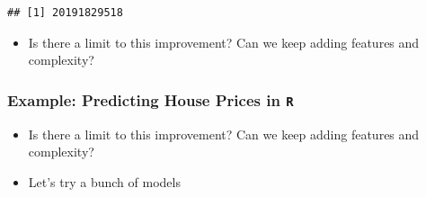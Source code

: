 \documentclass[
  shownotes,
  xcolor={svgnames},
  hyperref={colorlinks,citecolor=DarkBlue,linkcolor=DarkRed,urlcolor=DarkBlue}
  , aspectratio=169]{beamer}
\newenvironment{Shaded}{\begin{snugshade}}{\end{snugshade}}
\newcommand{\DataTypeTok}[1]{\textcolor[rgb]{0.13,0.29,0.53}{#1}}
\newcommand{\DecValTok}[1]{\textcolor[rgb]{0.00,0.00,0.81}{#1}}
\newcommand{\KeywordTok}[1]{\textcolor[rgb]{0.13,0.29,0.53}{\textbf{#1}}}
\newcommand{\NormalTok}[1]{#1}
\newcommand{\OperatorTok}[1]{\textcolor[rgb]{0.81,0.36,0.00}{\textbf{#1}}}
\newcommand{\StringTok}[1]{\textcolor[rgb]{0.31,0.60,0.02}{#1}}
\begin{document}
\begin{frame}[fragile]
\begin{tiny}
\begin{verbatim}
## [1] 20191829518
\end{verbatim}
\end{tiny}

\begin{itemize}
  \item Is there a limit to this improvement? Can we keep adding features and complexity?
\end{itemize}

\end{frame}

\begin{frame}[fragile]
\frametitle{Example: Predicting House Prices in \texttt{R}}

\begin{itemize}
  \item Is there a limit to this improvement? Can we keep adding features and complexity?
  \item Let's try a bunch of models
\end{itemize}

\begin{Shaded}
\scriptsize
{}
\end{Shaded}
\end{frame}
\end{document}
